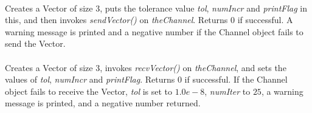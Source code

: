 \\ 
Creates a Vector of size 3, puts the tolerance value {\em tol}, {\em
numIncr} and {\em printFlag}
in this, and then invokes {\em sendVector()} on {\em
theChannel}. Returns $0$ if successful. A warning message is printed
and a negative number if the Channel object fails to send the Vector.\\ 

\\ 
Creates a Vector of size 3, invokes {\em recvVector()} on {\em
theChannel}, and sets the values of {\em tol}, {\em numIncr} and {\em printFlag}.
Returns $0$ if successful. If the Channel object fails to receive the
Vector, {\em tol} is set to $1.0e-8$, {\em numIter} to $25$, a warning
message is printed, and a negative number returned.







